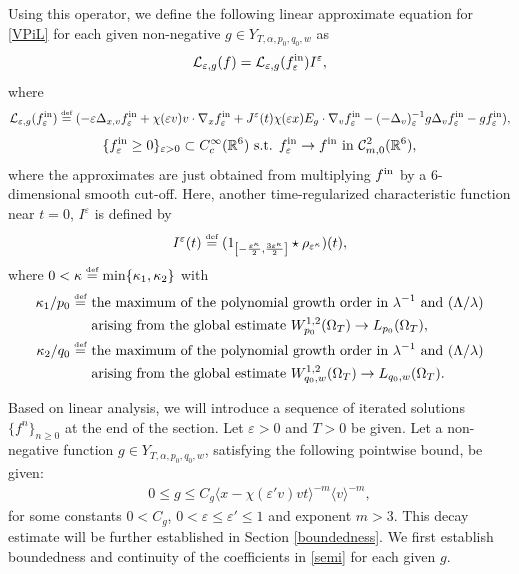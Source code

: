 \documentclass[reqno,11pt,final]{amsart}
\theoremstyle{plain}
\numberwithin{equation}{section}
\numberwithin{theorem}{section}
\newcommand{\eqdef }{\overset{\mbox{\tiny{def}}}{=}}
\begin{document}
Using this operator, we define the following linear approximate equation for \eqref{VPiL} for each given non-negative $g\in Y_{T,\alpha,p_0,q_0,w}$ as
\begin{align}\label{semi}
\mathcal{L}_{\varepsilon,g}(f) = \mathcal{L}_{\varepsilon,g}(f^\textup{in}_\varepsilon)I^\varepsilon,
\end{align}where
\begin{equation*}
    \mathcal{L}_{\varepsilon,g}(f^\textup{in}_\varepsilon)\eqdef 
     (-\varepsilon\Delta_{x,v}f^\textup{in}_\varepsilon +\chi(\varepsilon v)v\cdot\nabla_xf^\textup{in}_\varepsilon + J^\varepsilon(t)\chi(\varepsilon x)E_g \cdot\nabla_vf^\textup{in}_\varepsilon - (-\Delta_v)_\varepsilon^{-1}g\Delta_vf^\textup{in}_\varepsilon - gf^\textup{in}_\varepsilon),
\end{equation*}
\begin{align}\label{approx initial}
    \{f^\textup{in}_\varepsilon\ge0\}_{\varepsilon>0}\subset C^\infty_c(\mathbb{R}^6)\textup{ s.t. } f^\textup{in}_\varepsilon \to f^\textup{in} \textup{ in }\mathcal{C}^2_{m,0}(\mathbb{R}^6),
\end{align}where the approximates are just obtained from multiplying $f^\textup{in}$ by a $6$-dimensional smooth cut-off. Here, another time-regularized characteristic function near $t=0$, $I^\varepsilon$ is defined by
\begin{align}\label{I def}
    I^\varepsilon(t) \eqdef (1_{\left[-\frac{\varepsilon^\kappa}{2}, \frac{3\varepsilon^\kappa}{2}\right]}\star \rho_{\varepsilon^\kappa})(t),
\end{align}where $0<\kappa \eqdef \min\{\kappa_1, \kappa_2\}$ with
\begin{align*}
    \kappa_1/p_0 \eqdef &\textup{ the maximum of the polynomial growth order in }\lambda^{-1} \textup{ and } (\Lambda/\lambda) \\
    &\textup{ arising from the global estimate } W_{p_0}^{1,2}(\Omega_T)\to L_{p_0}(\Omega_T),\\
    \kappa_2/q_0 \eqdef &\textup{ the maximum of the polynomial growth order in }\lambda^{-1} \textup{ and } (\Lambda/\lambda) \\
    &\textup{ arising from the global estimate } W_{q_0,w}^{1,2}(\Omega_T)\to L_{q_0,w}(\Omega_T).
\end{align*}

Based on linear analysis, we will introduce a sequence of iterated solutions $\{f^n\}_{n\ge 0}$ at the end of the section. Let $\varepsilon>0$ and $T>0$ be given. Let a non-negative function $g\in Y_{T,\alpha,p_0,q_0,w}$, satisfying the following pointwise bound, be given:
\begin{align}\label{bound g}
0\le g\le C_g \langle x-\chi(\varepsilon'v)vt\rangle^{-m} \langle v\rangle^{-m},
\end{align}for some constants $0<C_g$, $0<\varepsilon\le \varepsilon'\le 1$ and exponent $m>3$. This decay estimate will be further established in Section \ref{boundedness}. We first establish boundedness and continuity of the coefficients  in \eqref{semi} for each given $g$.
\end{document}
